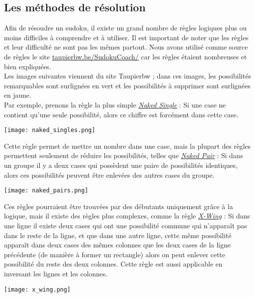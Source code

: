 \documentclass[a4paper]{article}
\begin{document}
\subsection{Les méthodes de résolution}
\begin{justify}
    \qquad Afin de résoudre un sudoku, il existe un grand nombre de règles logiques plus ou moins difficiles à comprendre et à utiliser. Il est important de noter que les règles et leur difficulté ne sont pas les mêmes partout. Nous avons utilisé comme source de règles le site \href{https://www.taupierbw.be/SudokuCoach/}{\uline{taupierbw.be/SudokuCoach/}} car les règles étaient nombreuses et bien expliquées. \\
    
    Les images suivantes viennent du site Taupierbw ; dans ces images, les possibilités remarquables sont surlignées en vert et les possibilités à supprimer sont surlignées en jaune. \\
    
    \noindent Par exemple, prenons la règle la plus simple \href{https://www.taupierbw.be/SudokuCoach/SC_Singles.shtml}{\uline{\textit{Naked Single}}} : Si une case ne contient qu'une seule possibilité, alors ce chiffre est forcément dans cette case. 
    
    \begin{center}
        \texttt{[image: naked\_singles.png]}
    \end{center}

    Cette règle permet de mettre un nombre dans une case, mais la plupart des règles permettent seulement de réduire les possibilités, telles que  \href{https://www.taupierbw.be/SudokuCoach/SC_NakedPairs.shtml}{\uline{\textit{Naked Pair}}} : Si dans un groupe il y a deux cases qui possèdent une paire de possibilités identiques, alors ces possibilités peuvent être enlevées des autres cases du groupe.

    \begin{center}
        \texttt{[image: naked\_pairs.png]}
    \end{center}

    Ces règles pourraient être trouvées par des débutants uniquement grâce à la logique, mais il existe des règles plus complexes, comme la règle \href{https://www.taupierbw.be/SudokuCoach/SC_XWing.shtml}{\uline{\textit{X-Wing}}}
    : Si dans une ligne il existe deux cases qui ont une possibilité commune qui n'apparaît pas dans le reste de la ligne, et que dans une autre ligne, cette même possibilité apparaît dans deux cases des mêmes colonnes que les deux cases de la ligne précédente (de manière à former un rectangle) alors on peut enlever cette possibilité du reste des deux colonnes.
    Cette règle est aussi applicable en inversant les lignes et les colonnes.
    
    \begin{center}
        \texttt{[image: x\_wing.png]}
    \end{center}
\end{justify}
\end{document}
